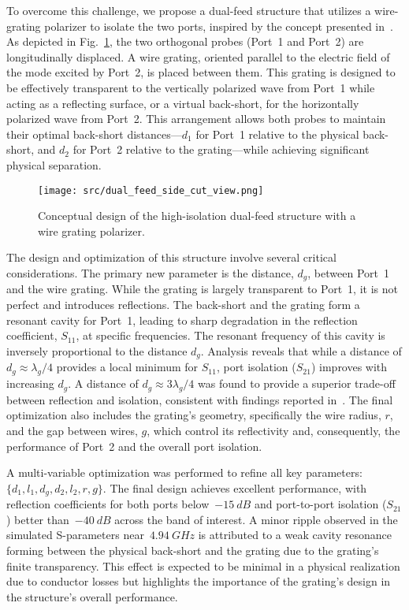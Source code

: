 \documentclass[journal]{IEEEtran}
\begin{document}
To overcome this challenge, we propose a dual-feed structure that utilizes a wire-grating polarizer to isolate the two ports, inspired by the concept presented in~\cite{karki-et-al:dual-polarized-probe-for-planar-near-field-measurement}. As depicted in Fig.~\ref{fig:dual-feed-conceptual}, the two orthogonal probes (Port~1 and Port~2) are longitudinally displaced. A wire grating, oriented parallel to the electric field of the mode excited by Port~2, is placed between them. This grating is designed to be effectively transparent to the vertically polarized wave from Port~1 while acting as a reflecting surface, or a virtual back-short, for the horizontally polarized wave from Port~2. This arrangement allows both probes to maintain their optimal back-short distances---$d_1$ for Port~1 relative to the physical back-short, and $d_2$ for Port~2 relative to the grating---while achieving significant physical separation.

\begin{figure}[!ht]
    \texttt{[image: src/dual\_feed\_side\_cut\_view.png]}
    \caption{\label{fig:dual-feed-conceptual}Conceptual design of the high-isolation dual-feed structure with a wire grating polarizer.}
\end{figure}

The design and optimization of this structure involve several critical considerations. The primary new parameter is the distance, $d_g$, between Port~1 and the wire grating. While the grating is largely transparent to Port~1, it is not perfect and introduces reflections. The back-short and the grating form a resonant cavity for Port~1, leading to sharp degradation in the reflection coefficient, $S_{11}$, at specific frequencies. The resonant frequency of this cavity is inversely proportional to the distance $d_g$. Analysis reveals that while a distance of $d_g \approx \lambda_g/4$ provides a local minimum for $S_{11}$, port isolation ($S_{21}$) improves with increasing $d_g$. A distance of $d_g \approx 3\lambda_g/4$ was found to provide a superior trade-off between reflection and isolation, consistent with findings reported in~\cite{karki-et-al:dual-polarized-probe-for-planar-near-field-measurement}. The final optimization also includes the grating's geometry, specifically the wire radius, $r$, and the gap between wires, $g$, which control its reflectivity and, consequently, the performance of Port~2 and the overall port isolation.

A multi-variable optimization was performed to refine all key parameters: $\{d_1, l_1, d_g, d_2, l_2, r, g\}$. The final design achieves excellent performance, with reflection coefficients for both ports below~$-\qty{15}{dB}$ and port-to-port isolation ($S_{21}$) better than~$-\qty{40}{dB}$ across the band of interest. A minor ripple observed in the simulated S-parameters near~$\qty{4.94}{GHz}$ is attributed to a weak cavity resonance forming between the physical back-short and the grating due to the grating's finite transparency. This effect is expected to be minimal in a physical realization due to conductor losses but highlights the importance of the grating's design in the structure's overall performance.
\end{document}
